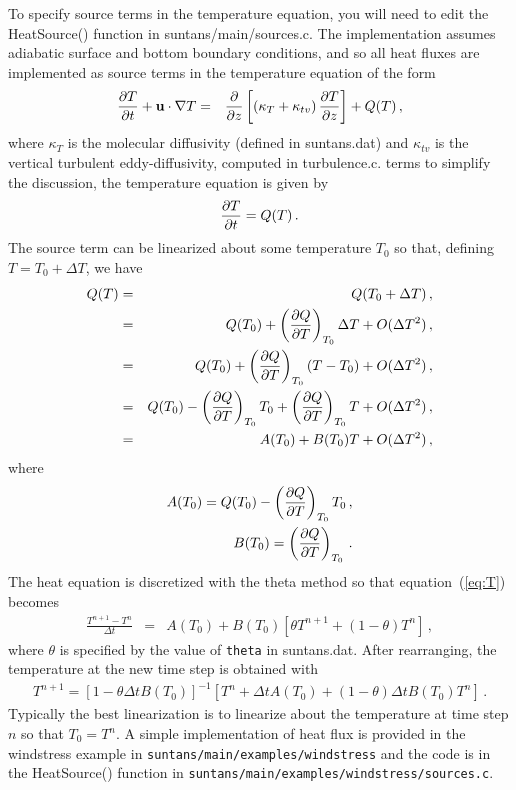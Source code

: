 To specify source terms in the temperature equation, you will need to edit the
HeatSource() function in suntans/main/sources.c.  The implementation assumes
adiabatic surface and bottom boundary conditions, and so all heat fluxes are implemented
as source terms in the temperature equation of the form
\begin{eqnarray*}
\frac{\partial{T}}{\partial{t}} + \mathbf{u}\cdot\nabla T &=& \frac{\partial{}}{\partial{z}}\left[\left(\kappa_T + \kappa_{tv}\right) \frac{\partial{T}}{\partial{z}}\right] + Q(T)\,,
\end{eqnarray*}
where $\kappa_T$ is the molecular diffusivity (defined in suntans.dat) and $\kappa_{tv}$ is the
vertical turbulent eddy-diffusivity, computed in turbulence.c.  
terms to simplify the discussion, the temperature equation is given by
\begin{equation}\label{eq:T}
\frac{\partial{T}}{\partial{t}}  = Q(T)\,.
\end{equation}
The source term can be linearized about some temperature $T_0$ so that, defining $T=T_0 + \Delta T$,
we have
\begin{eqnarray*}
Q(T) &=& Q(T_0 + \Delta T)\,,\\
     &=& Q(T_0) + \left(\frac{\partial{Q}}{\partial{T}}\right)_{T_0}\Delta T  + O(\Delta T^2)\,,\\
     &=& Q(T_0) + \left(\frac{\partial{Q}}{\partial{T}}\right)_{T_0}\left(T - T_0\right)  + O(\Delta T^2)\,,\\
     &=& Q(T_0) - \left(\frac{\partial{Q}}{\partial{T}}\right)_{T_0}T_0 + \left(\frac{\partial{Q}}{\partial{T}}\right)_{T_0} T + O(\Delta T^2)\,,\\
     &=& A(T_0) + B(T_0) T + O(\Delta T^2)\,,
\end{eqnarray*}
where
\begin{eqnarray*}
A(T_0) = Q(T_0) - \left(\frac{\partial{Q}}{\partial{T}}\right)_{T_0}T_0\,,\\
B(T_0) = \left(\frac{\partial{Q}}{\partial{T}}\right)_{T_0}\,.
\end{eqnarray*}
The heat equation is discretized with the theta method so that equation~(\ref{eq:T}) becomes
\begin{eqnarray*}
\frac{T^{n+1} - T^n}{\Delta t} &=& A(T_0) + B(T_0)\left[\theta T^{n+1}+(1-\theta)T^n\right]\,,
\end{eqnarray*}
where $\theta$ is specified by the value of \verb+theta+ in suntans.dat.
After rearranging, the temperature at the new time step is obtained with
\begin{eqnarray*}
T^{n+1} = \left[1 - \theta \Delta t B(T_0)\right]^{-1}\left[T^n + \Delta t A(T_0) 
                  + (1-\theta) \Delta t B(T_0)T^n\right]\,.
\end{eqnarray*}
Typically the best linearization is to linearize about the temperature at time step $n$ so
that $T_0=T^n$. A simple implementation of heat flux is provided in the windstress example
in \verb+suntans/main/examples/windstress+ and the code is in the HeatSource() function in
\verb+suntans/main/examples/windstress/sources.c+.

